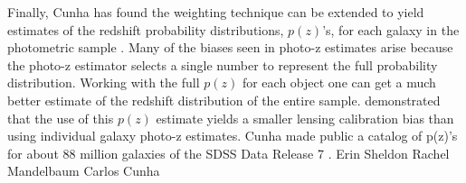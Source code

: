 \documentclass[11pt]{article}
\begin{document}
\begin{singlespace}
Finally, Cunha has found the weighting technique can be extended
to yield estimates of the redshift probability distributions, $p(z)$'s,
for each galaxy in the photometric sample \citep{cun09a}. Many of the
biases seen in photo-z estimates arise because the photo-z estimator
selects a single number to represent the full probability distribution.
Working with the full $p(z)$ for each object one can get a much
better estimate of the redshift distribution of the entire sample. 
\cite{man08} demonstrated that the use of this $p(z)$ estimate
yields a smaller lensing calibration bias than using individual galaxy
photo-z estimates. Cunha made public a catalog of p(z)'s for about 88
million galaxies of the SDSS Data Release 7 \citep{cun09a}.
\newline
\newline
\noindent
Erin Sheldon
\newline
Rachel Mandelbaum
\newline
Carlos Cunha



\end{singlespace}
\end{document}
